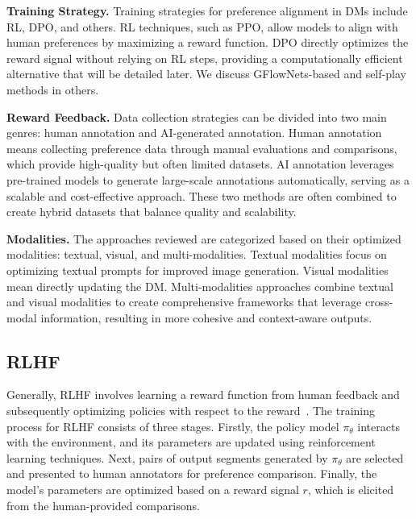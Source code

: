 \noindent \textbf{Training Strategy.} Training strategies for preference alignment in DMs include RL, DPO, and others. RL techniques, such as PPO, allow models to align with human preferences by maximizing a reward function. DPO directly optimizes the reward signal without relying on RL steps, providing a computationally efficient alternative that will be detailed later. We discuss GFlowNets-based and self-play methods in others.

\noindent \textbf{Reward Feedback.} Data collection strategies can be divided into two main genres: human annotation and AI-generated annotation. Human annotation means collecting preference data through manual evaluations and comparisons, which provide high-quality but often limited datasets. AI annotation leverages pre-trained models to generate large-scale annotations automatically, serving as a scalable and cost-effective approach. These two methods are often combined to create hybrid datasets that balance quality and scalability.

\noindent \textbf{Modalities.} The approaches reviewed are categorized based on their optimized modalities: textual, visual, and multi-modalities. Textual modalities focus on optimizing textual prompts for improved image generation. Visual modalities mean directly updating the DM. Multi-modalities approaches combine textual and visual modalities to create comprehensive frameworks that leverage cross-modal information, resulting in more cohesive and context-aware outputs.

\subsection{RLHF}
Generally, RLHF involves learning a reward function from human feedback and subsequently optimizing policies with respect to the reward~\citep{christiano2017deep}. The training process for RLHF consists of three stages. Firstly, the policy model \( \pi_\theta \) interacts with the environment, and its parameters are updated using reinforcement learning techniques. Next, pairs of output segments generated by \( \pi_\theta \) are selected and presented to human annotators for preference comparison. Finally, the model's parameters are optimized based on a reward signal \( r \), which is elicited from the human-provided comparisons.

